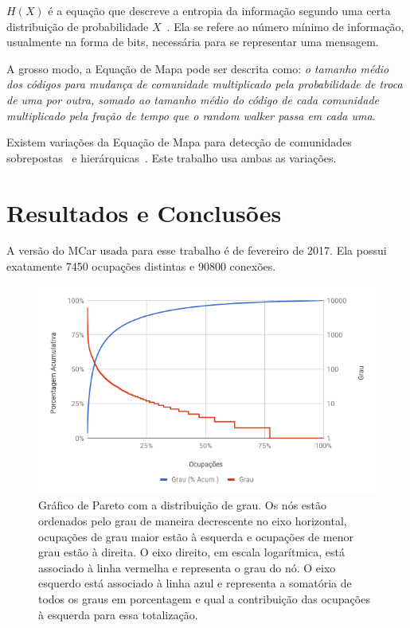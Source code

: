 \documentclass[
  article,
  11pt,
  a4paper,
  english,
  brazil,
  sumario=tradicional]{abntex2}
\begin{document}
$H(X)$ é a equação que descreve a entropia da informação segundo uma certa distribuição de probabilidade $X$~\cite{Shannon1948-ic}. Ela se refere ao número mínimo de informação, usualmente na forma de bits, necessária para se representar uma mensagem.

A grosso modo, a Equação de Mapa pode ser descrita como: \textit{o tamanho médio dos códigos para mudança de comunidade multiplicado pela probabilidade de troca de uma por outra, somado ao tamanho médio do código de cada comunidade multiplicado pela fração de tempo que o \textit{random walker} passa em cada uma}.

Existem variações da Equação de Mapa para detecção de comunidades sobrepostas~\cite{Viamontes_Esquivel2011-it} e hierárquicas~\cite{Rosvall2011-yi}. Este trabalho usa ambas as variações.


\section{Resultados e Conclusões} \label{sec:resultados}



A versão do MCar usada para esse trabalho é de fevereiro de 2017. Ela possui exatamente 7450 ocupações distintas e 90800 conexões.

\begin{figure}[htb]
  \centering
  \includegraphics[width=0.9\linewidth]{pareto-ocupacoes.png}
  \caption{Gráfico de Pareto com a distribuição de grau. Os nós estão ordenados pelo grau de maneira decrescente no eixo horizontal, ocupações de grau maior estão à esquerda e ocupações de menor grau estão à direita. O eixo direito, em escala logarítmica, está associado à linha vermelha e representa o grau do nó. O eixo esquerdo está associado à linha azul e representa a somatória de todos os graus em porcentagem e qual a contribuição das ocupações à esquerda para essa totalização.}
  \label{fig:pareto-ocupacoes}
\end{figure}
\end{document}
